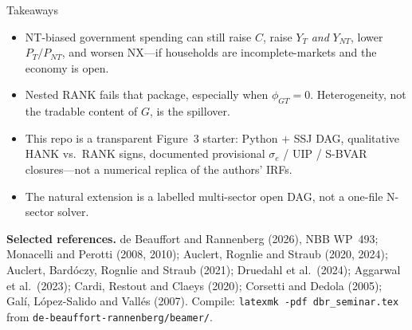 \documentclass[11pt,aspectratio=169]{beamer}
\begin{document}
\begin{frame}{Takeaways}
  \begin{itemize}
    \item NT-biased government spending can still raise $C$, raise $Y_T$
          \emph{and} $Y_{NT}$, lower $P_T/P_{NT}$, and worsen NX---if
          households are incomplete-markets and the economy is open.
    \item Nested RANK fails that package, especially when $\phi_{GT}=0$.
          Heterogeneity, not the tradable content of $G$, is the spillover.
    \item This repo is a transparent Figure~3 starter: Python + SSJ DAG,
          qualitative HANK vs.\ RANK signs, documented provisional
          $\sigma_e$ / UIP / S-BVAR closures---not a numerical replica of
          the authors' IRFs.
    \item The natural extension is a labelled multi-sector open DAG, not a
          one-file N-sector solver.
  \end{itemize}
  \vfill
  {\scriptsize
  \textbf{Selected references.}
  de Beauffort and Rannenberg (2026), NBB WP~493;
  Monacelli and Perotti (2008, 2010);
  Auclert, Rognlie and Straub (2020, 2024);
  Auclert, Bard\'oczy, Rognlie and Straub (2021);
  Druedahl et al.\ (2024); Aggarwal et al.\ (2023);
  Cardi, Restout and Claeys (2020); Corsetti and Dedola (2005);
  Gal\'i, L\'opez-Salido and Vall\'es (2007).
  Compile: \texttt{latexmk -pdf dbr\_seminar.tex} from
  \texttt{de-beauffort-rannenberg/beamer/}.}
\end{frame}
\end{document}

